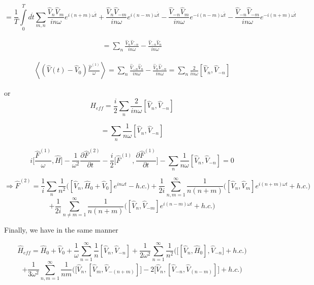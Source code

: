 $$ = \frac{1}{T}\int\limits_{0}^{T}d\acute{t}\displaystyle\sum_{m,n}\frac{\hat{V}_n\hat{V}_m}{in\omega}e^{i(n+m)\omega\acute{t}}+ \frac{\hat{V}_n\hat{V}_{-m}}{in\omega}e^{i(n-m)\omega\acute{t}}
- \frac{\hat{V}_{-n}\hat{V}_m}{in\omega}e^{-i(n-m)\omega\acute{t}} - \frac{\hat{V}_{-n}\hat{V}_{-m}}{in\omega}e^{-i(n+m)\omega\acute{t}}$$

\begin{eqnarray}
 = \displaystyle\sum_{n}\frac{\hat{V}_n\hat{V}_{-n}}{in\omega} - \frac{\hat{V}_{-n}\hat{V}_n}{in\omega}
\end{eqnarray}

\begin{eqnarray}
 \left\langle(\hat{V}(t)-\hat{V}_0)\frac{\hat{F}^{(1)}}{\omega}\right\rangle = \displaystyle\sum_{n}\frac{\hat{V}_{-n}\hat{V}_{n}}{in\omega} - \frac{\hat{V}_{n}\hat{V}_{-n}}{in\omega} = \displaystyle\sum_{n}\frac{2}{in\omega}[\hat{V}_n,\hat{V}_{-n}]
\end{eqnarray}

% 

or $$ H_{eff} = \frac{i}{2}\displaystyle\sum_{n}\frac{2}{in\omega}[\hat{V}_n,\hat{V}_{-n}]$$

$$ = \displaystyle\sum_{n}\frac{1}{n\omega}[\hat{V}_n,\hat{V}_{-n}]$$

$$ i\biggl[\frac{\hat{F}^{(1)}}{\omega},\hat{H}\biggr]- \frac{1}{\omega^2}\frac{\partial\hat{F}^{(2)}}{\partial t}
 - \frac{i}{2}\biggl[\hat{F}^{(1)},\frac{\partial \hat{F}^{(1)}}{\partial t}\biggr]-\displaystyle\sum_{n}\frac{1}{n\omega}[\hat{V}_n,\hat{V}_{-n}]=0$$
 
 $$ \Rightarrow \hat{F}^{(2)} = \frac{1}{i}\displaystyle\sum_{n}\frac{1}{n^2}\biggl([\hat{V}_n,\hat{H}_0+\hat{V}_0]e^{in\omega t}-h.c.\biggr)
  + \frac{1}{2i}\displaystyle\sum_{n,m=1}^{\infty}\frac{1}{n(n+m)}\biggl([\hat{V}_n,\hat{V}_m]e^{i(n+m)\omega t} + h.c.\biggr)$$
 $$ + \frac{1}{2i}\displaystyle\sum_{n\neq m=1}^{\infty}\frac{1}{n(n+m)}\biggl([\hat{V}_n,\hat{V}_{-m}]e^{i(n-m)\omega t} + h.c.\biggr)$$
 
 Finally, we have in the same manner
 
 $$ \hat{H}_{eff} = \hat{H}_0 + \hat{V}_0+ \frac{1}{\omega}\displaystyle\sum_{n=1}^{\infty}\frac{1}{n}[\hat{V}_n,\hat{V}_{-n}] + \frac{1}{2\omega^2}
 \displaystyle\sum_{n=1}^{\infty}\frac{1}{n^2}\biggl(\biggl[[\hat{V}_n,\hat{H}_0],\hat{V}_{-n}\biggr]+h.c. \biggr)$$
 $$ +\frac{1}{3\omega^2}\displaystyle\sum_{n,m=1}^{\infty}\frac{1}{nm}\biggl(\biggl[\hat{V}_n,[\hat{V}_m,\hat{V}_{-(n+m)}]\biggr] -2\biggl[\hat{V}_n,[\hat{V}_{-n}
 ,\hat{V}_{(n-m)}]\biggr] + h.c.\biggr)$$
 
